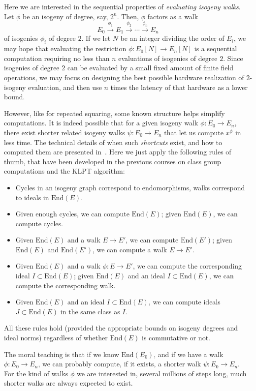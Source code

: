 \documentclass{article}
\def\End{\mathrm{End}}
\begin{document}
Here we are interested in the sequential properties of
\emph{evaluating isogeny walks}.  Let $\phi$ be an isogeny of degree,
say, $2^n$. Then, $\phi$ factors as a walk
\[E_0 \overset{\phi_1}{\longrightarrow} E_1
  \overset{\phi_2}{\longrightarrow} \cdots
  \overset{\phi_n}{\longrightarrow} E_n\] of isogenies $\phi_i$ of
degree $2$.  If we let $N$ be an integer dividing the order of $E_i$,
we may hope that evaluating the restriction $\phi : E_0[N] \to E_n[N]$
is a sequential computation requiring no less than $n$ evaluations of
isogenies of degree $2$.  Since isogenies of degree $2$ can be
evaluated by a small fixed amount of finite field operations, we may
focus on designing the best possible hardware realization of
$2$-isogeny evaluation, and then use $n$ times the latency of that
hardware as a lower bound.

However, like for repeated squaring, some known structure helps
simplify computations.  It is indeed possible that for a given isogeny
walk $\phi:E_0\to E_n$, there exist shorter related isogeny walks
$\psi:E_0\to E_n$ that let us compute $x^\phi$ in less time.  The
technical details of when such \emph{shortcuts} exist, and how to
computed them are presented in~\cite{AC:DMPS19}.  Here we just apply
the following rules of thumb, that have been developed in the previous
courses on class group computations and the KLPT algorithm:
\begin{itemize}
\item Cycles in an isogeny graph correspond to endomorphisms, walks
  correspond to ideals in $\End(E)$.
\item Given enough cycles, we can compute $\End(E)$; given $\End(E)$,
  we can compute cycles.
\item Given $\End(E)$ and a walk $E\to E'$, we can compute $\End(E')$;
  given $\End(E)$ and $\End(E')$, we can compute a walk $E\to E'$.
\item Given $\End(E)$ and a walk $\phi:E\to E'$, we can compute the
  corresponding ideal $I\subset\End(E)$; given $\End(E)$ and an ideal
  $I\subset\End(E)$, we can compute the corresponding walk.
\item Given $\End(E)$ and an ideal $I\subset\End(E)$, we can compute
  ideals $J\subset\End(E)$ in the same class as $I$.
\end{itemize}
All these rules hold (provided the appropriate bounds on isogeny
degrees and ideal norms) regardless of whether $\End(E)$ is
commutative or not.

The moral teaching is that if we know $\End(E_0)$, and if we have a
walk $\phi:E_0\to E_n$, we can probably compute, if it exists, a
shorter walk $\psi:E_0\to E_n$.  For the kind of walks $\phi$ we are
interested in, several millions of steps long, much shorter walks are
always expected to exist.
\end{document}
